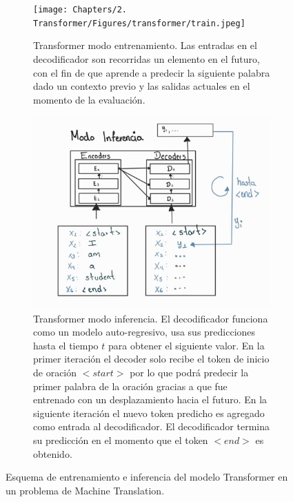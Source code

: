 \begin{figure}[ht!]
    \centering
    \begin{subfigure}[b]{0.49\textwidth}
        \centering
        \texttt{[image: Chapters/2. Transformer/Figures/transformer/train.jpeg]}
        \caption{Transformer modo entrenamiento. Las entradas en el decodificador son recorridas un
                 elemento en el futuro, con el fin de que aprende a predecir la siguiente palabra
                 dado un contexto previo y las salidas actuales en el momento de la evaluación.}
        \label{fig:trans_train}
    \end{subfigure}
    \begin{subfigure}[b]{0.49\textwidth}
        \centering
        \includegraphics[width=1.0 \textwidth]{Chapters/2. Transformer/Figures/transformer/inference.jpg}
        \caption{Transformer modo inferencia. El decodificador funciona como un modelo auto-regresivo,
        usa sus predicciones hasta el tiempo $t$ para obtener el siguiente valor. En la primer iteración
        el decoder solo recibe el token de inicio de oración $<start>$ por lo que podrá predecir la primer
        palabra de la oración gracias a que fue entrenado con un desplazamiento hacia el futuro. En la siguiente
        iteración el nuevo token predicho es agregado como entrada al decodificador. El decodificador
        termina su predicción en el momento que el token $<end>$ es obtenido.}
        \label{fig:trans_eval}
    \end{subfigure}
    \caption{Esquema de entrenamiento e inferencia del modelo Transformer en un problema de
             Machine Translation.}
        \label{fig:trans_te}
\end{figure}


